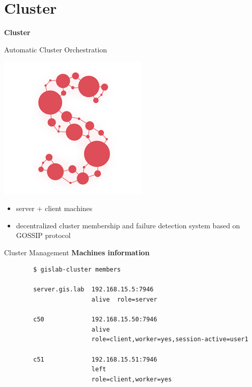 \documentclass[12pt]{beamer}
\begin{document}
\section{Cluster}
\begin{frame}
	\begin{center}
		\LARGE\textbf{Cluster}	
	\end{center}
\end{frame}

\begin{frame}{Automatic Cluster Orchestration}
	\begin{center}
		\includegraphics[keepaspectratio=true,height=0.5\textheight]{images/serf.png}
	\end{center}
	\begin{itemize}
		\item server + client machines
		\item decentralized cluster membership and failure detection system based on GOSSIP protocol
	\end{itemize}
\end{frame}

\begin{frame}[fragile]{Cluster Management}
	\textbf{Machines information}

	\lstset{language=sh}
	\begin{lstlisting}
		$ gislab-cluster members

		server.gis.lab  192.168.15.5:7946 
		                alive  role=server

		c50             192.168.15.50:7946
		                alive
		                role=client,worker=yes,session-active=user1

		c51             192.168.15.51:7946
		                left
		                role=client,worker=yes
	\end{lstlisting}
\end{frame}
\end{document}
